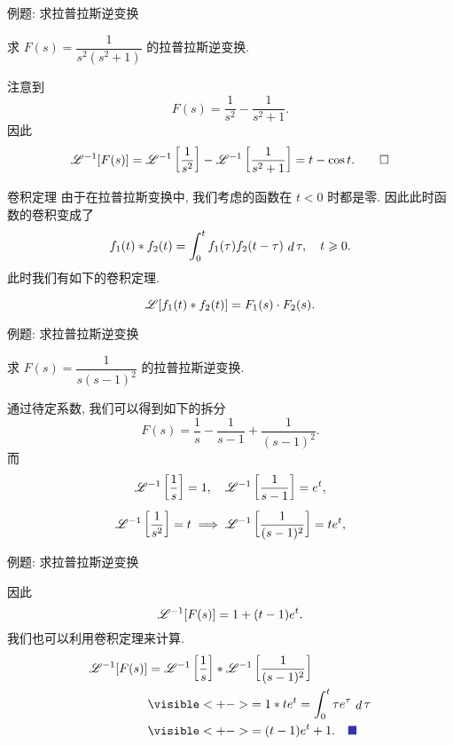\begin{frame}{例题: 求拉普拉斯逆变换}
\begin{example}
求 $F(s)=\dfrac1{s^2(s^2+1)}$ 的拉普拉斯逆变换.
\end{example}
\begin{solution}
注意到
\[F(s)=\frac1{s^2}-\frac1{s^2+1}.\]
\onslide<+->
因此
\[\mathscr{L}^{-1}[F(s)]=\mathscr{L}^{-1}\left[\frac1{s^2}\right]
-\mathscr{L}^{-1}\left[\frac1{s^2+1}\right]
=t-\cos t.\qedhere\]
\end{solution}
\end{frame}


\begin{frame}{卷积定理}
\onslide<+->
由于在拉普拉斯变换中, 我们考虑的函数在 $t<0$ 时都是零.
\onslide<+->
因此此时函数的卷积变成了
\[f_1(t)\ast f_2(t)=\int_0^t f_1(\tau)f_2(t-\tau)\,\mathop{d} \tau,\quad t\geqslant 0.\]
\onslide<+->
此时我们有如下的卷积定理.
\begin{theorem}[卷积定理]
\[\mathscr{L}[f_1(t)\ast f_2(t)]=F_1(s)\cdot F_2(s).\]
\end{theorem}
\end{frame}


\begin{frame}{例题: 求拉普拉斯逆变换}
\beqskip{6pt}
\begin{example}
求 $F(s)=\dfrac1{s(s-1)^2}$ 的拉普拉斯逆变换.
\end{example}
\begin{solutions}
通过待定系数, 我们可以得到如下的拆分
\[F(s)=\frac1s-\frac1{s-1}+\frac1{(s-1)^2}.\]
\onslide<+->
而
\[\mathscr{L}^{-1}\left[\frac1s\right]=1,\quad \mathscr{L}^{-1}\left[\frac1{s-1}\right]=e^t,\]
\onslide<+->
\[\mathscr{L}^{-1}\left[\frac1{s^2}\right]=t\implies\mathscr{L}^{-1}\left[\frac1{(s-1)^2}\right]=te^t,\]
\end{solutions}
\endgroup
\end{frame}


\begin{frame}{例题: 求拉普拉斯逆变换}
\begin{solutionc}
因此
\[\mathscr{L}^{-1}[F(s)]=1+(t-1)e^t.\]
\onslide<+->
我们也可以利用卷积定理来计算.
\onslide<+->
\begin{align*}
\msl^{-1}[F(s)]&=\msl^{-1}\left[\frac1s\right]\ast\msl^{-1}\left[\frac1{(s-1)^2}\right]\\
&\visible<+->{=1\ast te^t=\int_0^t\tau e^\tau\diff \tau}\\
&\visible<+->{=(t-1)e^t+1.\mqed}
\end{align*}
\end{solutionc}
\end{frame}



